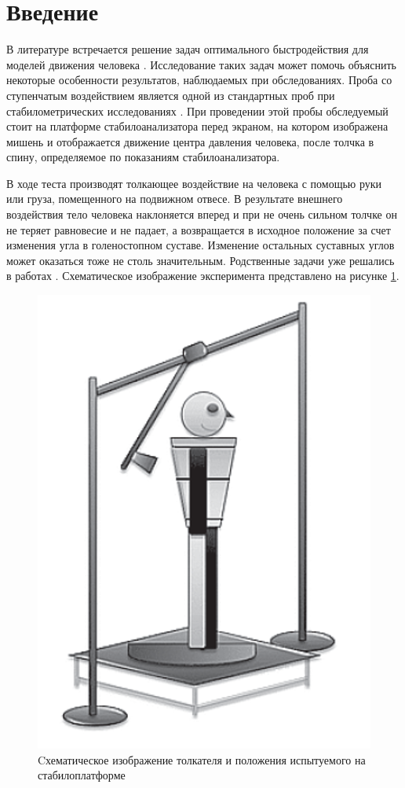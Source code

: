 \documentclass[a4paper,14pt]{article}
\theoremstyle{plain} %
\theoremstyle{definition} %
\theoremstyle{remark} %
\begin{document}
\thispagestyle{empty} %
\normalsize{
\newpage
\tableofcontents
\newpage

\section{Введение}
В литературе встречается решение задач оптимального быстродействия для моделей движения человека \cite{pandy,humanMovements}. Исследование таких задач может помочь объяснить некоторые особенности результатов, наблюдаемых при обследованиях.
Проба со ступенчатым воздействием является одной из стандартных проб
при стабилометрических исследованиях \cite{AdaptFizkult,stabilographTest}. При проведении этой пробы
обследуемый стоит на платформе стабилоанализатора перед экраном, на
котором изображена мишень и отображается движение центра давления
человека, после толчка в спину, определяемое по показаниям стабилоанализатора.

В ходе теста производят толкающее воздействие на человека с помощью руки или
груза, помещенного на подвижном отвесе. В результате внешнего
воздействия тело человека наклоняется вперед и при не очень сильном толчке
он не теряет равновесие и не падает, а возвращается в исходное
положение за счет изменения угла в голеностопном суставе. Изменение
остальных суставных углов может оказаться тоже не столь значительным.
Родственные задачи уже решались в работах \cite{PAKrychinin,kasatkin}.
Схематическое изображение эксперимента представлено на рисунке \ref{fig:pusher}.
\begin{figure}[h!]
    \centering
    \includegraphics[]{human.png}
    \caption{Cхематическое изображение толкателя и
        положения испытуемого на стабилоплатформе}
    \label{fig:pusher}
\end{figure}

}
\end{document}
